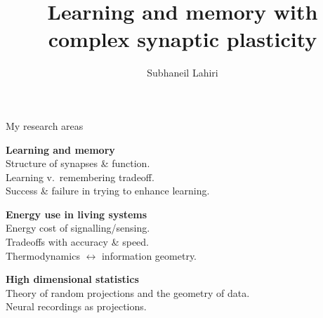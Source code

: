 \documentclass[final]{beamer}%
\title[Complex synapses]{Learning and memory with complex synaptic plasticity}
\author{Subhaneil Lahiri%
}
\institute[Stanford]{%
Stanford University, Applied Physics
}
\begin{document}

\begin{frame}
%
 \titlepage
%
\end{frame}



\begin{frame}{My research areas}
%
 \parbox[t]{0.45\linewidth}{
 \textbf{Learning and memory} \\
 Structure of synapses \& function.\\
 Learning v.\ remembering tradeoff. \\
 Success \& failure in trying to enhance learning.
 }
 \hfill
 \parbox[t]{0.45\linewidth}{
 \textbf{Energy use in living systems} \\
 Energy cost of signalling/sensing.\\
 Tradeoffs with accuracy \& speed.\\
 Thermodynamics $\leftrightarrow$ information geometry.
 }

\vp
\begin{center}
 \parbox[t]{0.45\linewidth}{
 \textbf{High dimensional statistics}\\
 Theory of random projections and the geometry of data.\\
 Neural recordings as projections.
 }
\end{center}
%
\end{frame}

\end{document}
